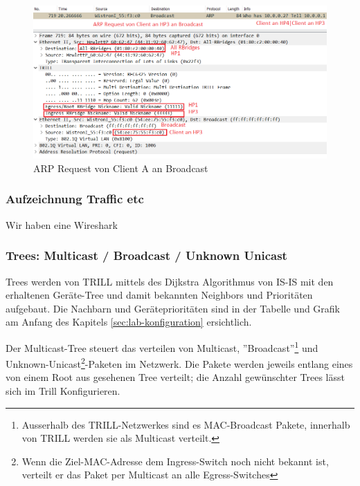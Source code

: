 \clearpage



\begin{figure}
\centering
\includegraphics[width=\linewidth]{images/trill_package}
\caption{ARP Request von Client A an Broadcast}
\label{fig:trillpackage}
\end{figure}



\subsubsection{Aufzeichnung Traffic etc}

Wir haben eine Wireshark


\subsubsection{Trees: Multicast / Broadcast / Unknown Unicast}

Trees werden von TRILL mittels des Dijkstra Algorithmus von IS-IS mit den erhaltenen Geräte-Tree und damit bekannten Neighbors und Prioritäten aufgebaut. Die Nachbarn und Geräteprioritäten sind in der Tabelle und Grafik am Anfang des Kapitels \ref{sec:lab-konfiguration} ersichtlich.

Der Multicast-Tree steuert das verteilen von Multicast, ''Broadcast''\footnote{Ausserhalb des TRILL-Netzwerkes sind es MAC-Broadcast Pakete, innerhalb von TRILL werden sie als Multicast verteilt.} und Unknown-Unicast\footnote{Wenn die Ziel-MAC-Adresse dem Ingress-Switch noch nicht bekannt ist, verteilt er das Paket per Multicast an alle Egress-Switches}-Paketen im Netzwerk. Die Pakete werden jeweils entlang eines von einem Root aus gesehenen Tree verteilt; die Anzahl gewünschter Trees lässt sich im Trill Konfigurieren.

